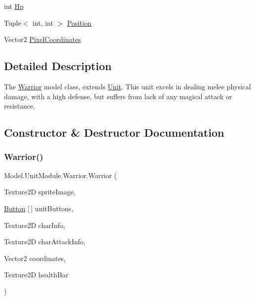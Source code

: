 \begin{DoxyCompactItemize}
\item 
int \hyperlink{class_model_1_1_unit_module_1_1_warrior_af8c7aa90b8bbd046bea9d400d9f479d2}{Hp}
\item 
Tuple$<$ int, int $>$ \hyperlink{class_model_1_1_unit_module_1_1_warrior_ad740dd04bc1b284e66e0f01a9597bb83}{Position}
\item 
Vector2 \hyperlink{class_model_1_1_unit_module_1_1_warrior_a98c38047e2e0c9cca83d36d06d61da83}{Pixel\+Coordinates}
\end{DoxyCompactItemize}


\subsection{Detailed Description}
The \hyperlink{class_model_1_1_unit_module_1_1_warrior}{Warrior} model class, extends \hyperlink{interface_model_1_1_unit_module_1_1_unit}{Unit}. This unit excels in dealing melee physical damage, with a high defense, but suffers from lack of any magical attack or resistance. 



\subsection{Constructor \& Destructor Documentation}
\hypertarget{class_model_1_1_unit_module_1_1_warrior_ade02c516e012f06440b011ea0b62dbc4}{}\label{class_model_1_1_unit_module_1_1_warrior_ade02c516e012f06440b011ea0b62dbc4} 
\subsubsection{\texorpdfstring{Warrior()}{Warrior()}}
{\footnotesize\ttfamily Model.\+Unit\+Module.\+Warrior.\+Warrior (\begin{DoxyParamCaption}\item[{Texture2D}]{sprite\+Image,  }\item[{\hyperlink{class_model_1_1_button}{Button} \mbox{[}$\,$\mbox{]}}]{unit\+Buttons,  }\item[{Texture2D}]{char\+Info,  }\item[{Texture2D}]{char\+Attack\+Info,  }\item[{Vector2}]{coordinates,  }\item[{Texture2D}]{health\+Bar }\end{DoxyParamCaption})\hspace{0.3cm}{\ttfamily [inline]}}

